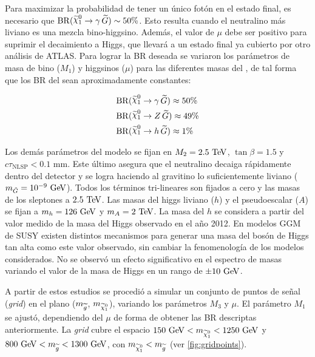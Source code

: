 Para maximizar la probabilidad de tener un único fotón en el estado final, es
necesario que $\mathrm{BR}(\ninoone \to \gam\,\gravino) \sim 50\%$. Esto resulta
cuando el neutralino más liviano es una mezcla bino-higgsino. Además, el valor
de $\mu$ debe ser positivo para suprimir el decaimiento a Higgs, que llevará a
un estado final ya cubierto por otro análisis de ATLAS. Para lograr la BR
deseada se variaron los parámetros de masa de bino ($M_1$) y higgsinos ($\mu$)
para las diferentes masas del {\ninoone}, de tal forma que los BR del {\ninoone}
sean aproximadamente constantes:

\begin{align}
  &\mathrm{BR}(\ninoone \to \gam\, \gravino) \approx 50\% \label{eq:n1_gam}\\
  &\mathrm{BR}(\ninoone \to Z\, \gravino) \approx 49\%    \label{eq:n1_z} \\
  &\mathrm{BR}(\ninoone \to h\, \gravino) \approx 1\%     \label{eq:n1_h}
\end{align}


Los demás parámetros del modelo se fijan en $M_2=2.5\tev$, $\tan\beta=1.5$ y
$c\tau_{\mathrm{NLSP}} < 0.1$ mm. Este último asegura que el neutralino decaiga
rápidamente dentro del detector y se logra haciendo al gravitino lo
suficientemente liviano ($m_{\tilde{G}}=10^{-9} \gev$). Todos los términos
tri-lineares son fijados a cero y las masas de los sleptones a $2.5 \tev$.
Las masas del higgs liviano ($h$) y el pseudoescalar ($A$) se fijan a
$m_{h} = 126 \gev$ y $m_{A} = 2 \tev$.
La masa del $h$ se considera a partir del valor
medido de la masa del Higgs observado en el a\~no 2012.
En modelos GGM de SUSY existen distintos
mecanismos\cite{Craig:2011yk,Auzzi:2011eu,Csaki:2012fh,Larsen:2012rq,Craig:2012hc}
para generar una masa del bosón de Higgs tan alta como este valor observado, sin
cambiar la fenomenología de los modelos considerados. No se observó un efecto
significativo en el espectro de masas variando el valor de la masa de Higgs en un
rango de $\pm 10 \gev$.

A partir de estos estudios se procedió a simular un conjunto de puntos de señal
(\emph{grid}) en el plano ($m_{\widetilde{g}}$, $m_{\ninoone}$), variando los parámetros
$M_3$ y $\mu$. El parámetro $M_1$ se ajustó, dependiendo del $\mu$ de forma de
obtener las BR descriptas anteriormente. La \emph{grid} cubre el espacio $150\gev <
m_{\ninoone} < 1250 \gev$ y $800\gev < m_{\gluino} < 1300 \gev$, con
$m_{\ninoone} < m_{\gluino}$ (ver \cref{fig:gridpoints}).


